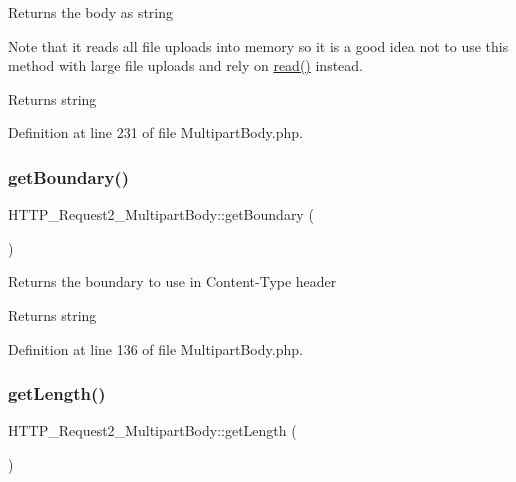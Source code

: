 Returns the body as string

Note that it reads all file uploads into memory so it is a good idea not to use this method with large file uploads and rely on \hyperlink{classHTTP__Request2__MultipartBody_aa392b34f91cbaf97962b7f77ea287cad}{read()} instead.

\begin{DoxyReturn}{Returns}
string 
\end{DoxyReturn}


Definition at line 231 of file Multipart\+Body.\+php.

\mbox{\label{classHTTP__Request2__MultipartBody_a67b4cebe7c8e77040d0c8961aa2b9aad}} 
\subsubsection{\texorpdfstring{get\+Boundary()}{getBoundary()}}
{\footnotesize\ttfamily H\+T\+T\+P\+\_\+\+Request2\+\_\+\+Multipart\+Body\+::get\+Boundary (\begin{DoxyParamCaption}{ }\end{DoxyParamCaption})}

Returns the boundary to use in Content-\/\+Type header

\begin{DoxyReturn}{Returns}
string 
\end{DoxyReturn}


Definition at line 136 of file Multipart\+Body.\+php.

\mbox{\label{classHTTP__Request2__MultipartBody_ad363b71daa46b8fc283bbe35c0c822c8}} 
\subsubsection{\texorpdfstring{get\+Length()}{getLength()}}
{\footnotesize\ttfamily H\+T\+T\+P\+\_\+\+Request2\+\_\+\+Multipart\+Body\+::get\+Length (\begin{DoxyParamCaption}{ }\end{DoxyParamCaption})}

